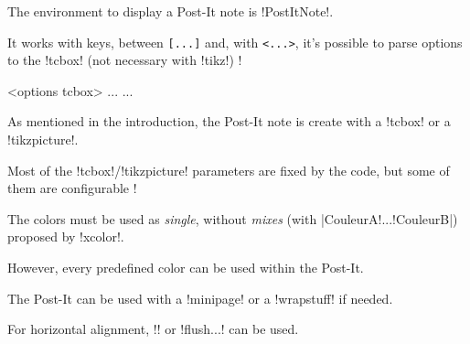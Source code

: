 \documentclass[english,a4paper,11pt]{article}
\begin{document}
\begin{cautionblock}
The environment to display a Post-It note is \packagetex!PostItNote!.

It works with keys, between \texttt{[...]} and, with \texttt{<...>}, it's possible to parse options to  the \motcletex!tcbox! (not necessary with \motcletex!tikz!) !
\end{cautionblock}

\begin{DemoCode}
\begin{PostIt}[keys]<options tcbox>
...
...
\end{PostIt}
\end{DemoCode}

\begin{noteblock}
As mentioned in the introduction, the Post-It note is create with a \motcletex!tcbox! or a  \motcletex!tikzpicture!.

Most of the \motcletex!tcbox!/\motcletex!tikzpicture! parameters are fixed by the code, but some of them are configurable !
\end{noteblock}

\begin{DemoCode}[]
\begin{PostItNote}
\lipsum[1][1-2]
\end{PostItNote}
\end{DemoCode}

\begin{DemoCode}[]
\begin{PostItNote}[Render=tikz]
\lipsum[1][1-2]
\end{PostItNote}
\begin{PostItNote}[Render=tikzv2]
\lipsum[1][1-2]
\end{PostItNote}
\end{DemoCode}

\begin{tipblock}
The colors must be used as \textit{single}, without \textit{mixes} (with \motcletex|CouleurA!...!CouleurB|) proposed by \packagetex!xcolor!.


However, every predefined color can be used within the Post-It.
\end{tipblock}

\begin{tipblock}
The Post-It can be used with a \motcletex!minipage! or a \motcletex!wrapstuff! if needed.

For horizontal alignment, \motcletex!\hfill! or \motcletex!flush...! can be used.
\end{tipblock}
\end{document}
